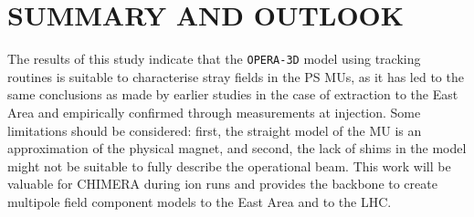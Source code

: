 \documentclass[a4paper,
               biblatex,     %
               keeplastbox,   %
               ]{jacow}
\begin{document}


\section{SUMMARY AND OUTLOOK}
The results of this study indicate that the \texttt{OPERA-3D} model using tracking routines is suitable to characterise stray fields in the PS MUs, as it has led to the same conclusions as made by earlier studies \cite{manglunki_beam_1997} in the case of extraction to the East Area and empirically confirmed through measurements at injection. Some limitations should be considered: first, the straight model of the MU is an approximation of the physical magnet, and second, the lack of shims in the model might not be suitable to fully describe the operational beam. This work will be valuable for CHIMERA during ion runs and provides the backbone to create multipole field component models to the East Area and to the LHC.

\printbibliography
\end{document}
